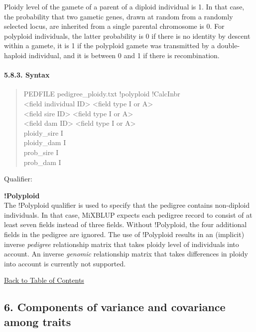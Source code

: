 Ploidy level of the gamete of a parent of a diploid individual is 1. In
that case, the probability that two gametic genes, drawn at random from
a randomly selected locus, are inherited from a single parental
chromosome is 0. For polyploid individuals, the latter probability is 0
if there is no identity by descent within a gamete, it is 1 if the
polyploid gamete was transmitted by a double-haploid individual, and it
is between 0 and 1 if there is recombination.

\paragraph{5.8.3. Syntax}\label{Gene77}

\begin{quote}
PEDFILE pedigree\_ploidy.txt !polyploid !CalcInbr\\
\textless field individual ID\textgreater{} \textless field type I or
A\textgreater{}\\
\textless field sire ID\textgreater{} \textless field type I or
A\textgreater{}\\
\textless field dam ID\textgreater{} \textless field type I or
A\textgreater{}\\
ploidy\_sire I\\
ploidy\_dam I\\
prob\_sire I\\
prob\_dam I
\end{quote}

Qualifier:

\textbf{!Polyploid}\\
The !Polyploid qualifier is used to specify that the pedigree contains
non-diploid individuals. In that case, MiXBLUP expects each pedigree
record to consist of at least seven fields instead of three fields.
Without !Polyploid, the four additional fields in the pedigree are
ignored. The use of !Polyploid results in an (implicit) inverse
\emph{pedigree} relationship matrix that takes ploidy level of
individuals into account. An inverse \emph{genomic} relationship matrix
that takes differences in ploidy into account is currently not
supported.

\hyperref[Tabl01]{Back to Table of Contents}

\newpage

\subsection{6. Components of variance and covariance among
traits}\label{Comp01}

